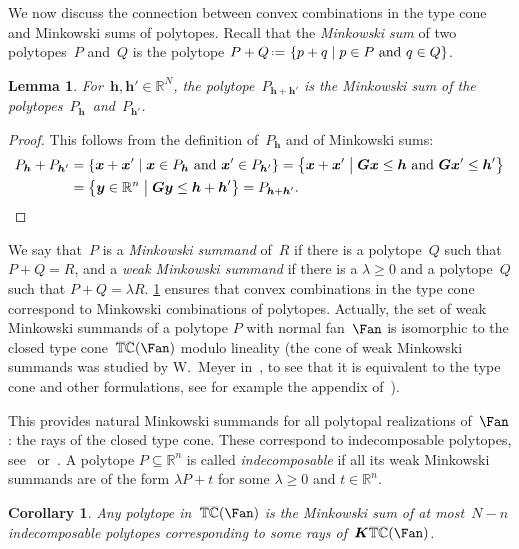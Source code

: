 \documentclass{amsart}
\newtheorem{corollary}[theorem]{Corollary}
\newtheorem{lemma}[theorem]{Lemma}
\theoremstyle{definition}
\newcommand{\R}{\mathbb{R}} %
\renewcommand{\b}[1]{{\boldsymbol{#1}}} %
\newcommand{\set}[2]{\left\{ #1 \;\middle|\; #2 \right\}} %
\newcommand{\eqdef}{\mbox{\,\raisebox{0.2ex}{\scriptsize\ensuremath{\mathrm:}}\ensuremath{=}\,}} %
\newcommand{\darkblue}{\color{darkblue}} %
\newcommand{\defn}[1]{\textsl{\darkblue #1}} %
\newcommand{\ctypeCone}{\smash{\overline{\mathbb{TC}}}} %
\begin{document}
We now discuss the connection between convex combinations in the type cone and Minkowski sums of polytopes.
Recall that the \defn{Minkowski sum} of two polytopes~$P$ and~$Q$ is the polytope $P + Q \eqdef \set{p + q}{p \in P\text{ and } q \in Q}$. 

\begin{lemma}
\label{lem:MinkowskiSum}
For~$\b{h}, \b{h}' \! \in \R^N$, the polytope~$P_{\b{h} + \b{h'}}$ is the Minkowski sum of the polytopes~$P_\b{h}$~and~$P_{\b{h}'}$.
\end{lemma}

\begin{proof}
This follows from the definition of~$P_\b{h}$ and of Minkowski sums:
\begin{align*}
P_\b{h} + P_{\b{h}'} & = \set{\b{x} + \b{x}'}{\b{x} \in P_\b{h} \text{ and } \b{x}' \in P_{\b{h}'}} = \set{\b{x} + \b{x}'}{\b{G}\b{x} \le \b{h} \text{ and } \b{G}\b{x}' \le \b{h}'} \\
& = \set{\b{y} \in \R^n}{\b{G}\b{y} \le \b{h} + \b{h}'} = P_{\b{h} + \b{h}'}.
\qedhere
\end{align*}
\end{proof}

We say that~$P$ is a \defn{Minkowski summand} of~$R$ if there is a polytope~$Q$ such that $P+Q = R$, and a \defn{weak Minkowski summand} if there is a $\lambda \ge 0$ and a polytope~$Q$ such that ${P + Q = \lambda R}$. 
\cref{lem:MinkowskiSum} ensures that convex combinations in the type cone correspond to Minkowski combinations of polytopes. Actually, the set of weak Minkowski summands of a polytope $P$ with normal fan~$\Fan$ is isomorphic to the closed type cone~$\ctypeCone(\Fan)$ modulo lineality (the cone of weak Minkowski summands was studied by W.~Meyer in~\cite{Meyer}, to see that it is equivalent to the type cone and other formulations, see for example the appendix of~\cite{PostnikovReinerWilliams}).

This provides natural Minkowski summands for all polytopal realizations of~$\Fan$: the rays of the closed type cone. These correspond to indecomposable polytopes, see~\cite{Meyer} or~\cite{McMullen-typeCone}. A polytope $P \subseteq \R^n$ is called \defn{indecomposable} if all its weak Minkowski summands are of the form $\lambda P+t$ for some $\lambda \ge 0$ and $t \in \R^n$.

\begin{corollary}
Any polytope in~$\ctypeCone(\Fan)$ is the Minkowski sum of at most~$N-n$ indecomposable polytopes corresponding to some rays of~$\b{K}\ctypeCone(\Fan)$.
\end{corollary}
\end{document}
